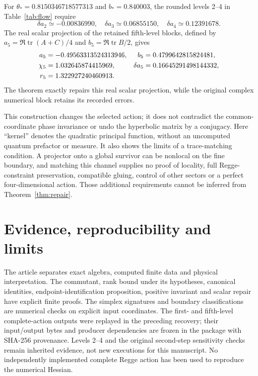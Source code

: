 \documentclass[11pt]{article}
\theoremstyle{remark}\newtheorem{remark}[theorem]{Remark}
\DeclareMathOperator{\tr}{tr}
\begin{document}
For $\theta_*=0.8150346718577313$ and $b_*=0.840003$, the rounded levels 2--4 in Table~\ref{tab:flow} require
\begin{equation}
\delta a_2\simeq-0.00836990,\quad
\delta a_3\simeq0.06855150,\quad
\delta a_4\simeq0.12391678.
\label{eq:repairs}
\end{equation}
The real scalar projection of the retained fifth-level blocks, defined by
$a_5=\Re\tr(A+C)/4$ and $b_5=\Re\tr B/2$, gives
\begin{align}
a_5&=-0.49563313524313946,&b_5&=0.4799642815824481,\notag\\
\chi_5&=1.032645874415969,&\delta a_5&=0.16645291498144332,\notag\\
r_5&=1.322927240460913.
\label{eq:repair5}
\end{align}
The theorem exactly repairs this real scalar projection, while the original complex numerical block retains its recorded errors.

This construction changes the selected action; it does not contradict the common-coordinate phase invariance or undo the hyperbolic matrix by a conjugacy.
Here ``kernel'' denotes the quadratic principal function, without an uncomputed quantum prefactor or measure.
It also shows the limits of a trace-matching condition.
A projector onto a global survivor can be nonlocal on the fine boundary, and matching this channel supplies no proof of locality, full Regge-constraint preservation, compatible gluing, control of other sectors or a perfect four-dimensional action.
Those additional requirements cannot be inferred from Theorem~\ref{thm:repair}.

\section{Evidence, reproducibility and limits}
\label{sec:evidence}
The article separates exact algebra, computed finite data and physical interpretation.
The commutant, rank bound under its hypotheses, canonical identities, endpoint-identification proposition, positive invariant and scalar repair have explicit finite proofs.
The simplex signatures and boundary classifications are numerical checks on explicit input coordinates.
The first- and fifth-level complete-action outputs were replayed in the preceding recovery; their input/output bytes and producer dependencies are frozen in the package with SHA-256 provenance.
Levels 2--4 and the original second-step sensitivity checks remain inherited evidence, not new executions for this manuscript.
No independently implemented complete Regge action has been used to reproduce the numerical Hessian.
\end{document}
